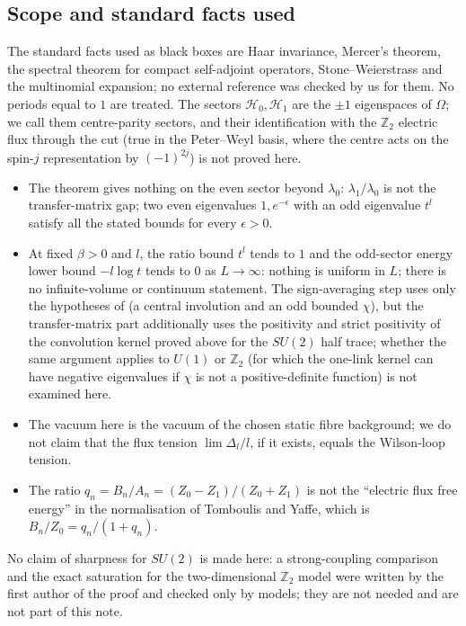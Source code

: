 \documentclass[11pt,a4paper]{article}
\theoremstyle{plain}
\theoremstyle{definition}
\theoremstyle{remark}
\numberwithin{equation}{section}
\newcommand{\lean}[1]{\texttt{\expandafter\leanbk\detokenize{#1}\relax}}
\def\leanbk#1{\ifx#1\relax\else\ifx#1.#1\allowbreak\else\ifx#1_#1\allowbreak\else#1\fi\fi\expandafter\leanbk\fi}
\begin{document}
\subsection{Scope and standard facts used}
The standard facts used as black boxes are Haar invariance, Mercer's theorem, the spectral theorem for compact self-adjoint operators, Stone--Weierstrass and the multinomial expansion; no external reference was checked by us for them. No periods equal to $1$ are treated. The sectors $\mathcal H_0,\mathcal H_1$ are the $\pm1$ eigenspaces of $\Omega$; we call them centre-parity sectors, and their identification with the $\mathbb Z_2$ electric flux through the cut (true in the Peter--Weyl basis, where the centre acts on the spin-$j$ representation by $(-1)^{2j}$) is not proved here.
\begin{itemize}
\item The theorem gives nothing on the even sector beyond $\lambda_0$: $\lambda_1/\lambda_0$ is not the transfer-matrix gap; two even eigenvalues $1,e^{-\epsilon}$ with an odd eigenvalue $t^l$ satisfy all the stated bounds for every $\epsilon>0$.
\item At fixed $\beta>0$ and $l$, the ratio bound $t^l$ tends to $1$ and the odd-sector energy lower bound $-l\log t$ tends to $0$ as $L\to\infty$: nothing is uniform in $L$; there is no infinite-volume or continuum statement. The sign-averaging step uses only the hypotheses of \lean{wilson_electric_flux_torus} (a central involution and an odd bounded $\chi$), but the transfer-matrix part additionally uses the positivity and strict positivity of the convolution kernel proved above for the $SU(2)$ half trace; whether the same argument applies to $U(1)$ or $\mathbb Z_2$ (for which the one-link kernel can have negative eigenvalues if $\chi$ is not a positive-definite function) is not examined here.
\item The vacuum here is the vacuum of the chosen static fibre background; we do not claim that the flux tension $\lim\Delta_l/l$, if it exists, equals the Wilson-loop tension.
\item The ratio $q_n=B_n/A_n=(Z_0-Z_1)/(Z_0+Z_1)$ is not the ``electric flux free energy'' in the normalisation of Tomboulis and Yaffe, which is $B_n/Z_0=q_n/(1+q_n)$.
\end{itemize}
No claim of sharpness for $SU(2)$ is made here: a strong-coupling comparison and the exact saturation for the two-dimensional $\mathbb Z_2$ model were written by the first author of the proof and checked only by models; they are not needed and are not part of this note.
\end{document}
